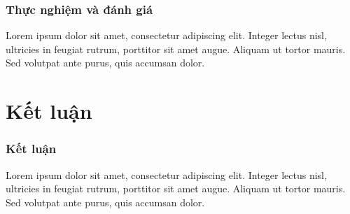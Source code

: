 \documentclass{beamer}
\begin{document}
	
	\begin{frame}
	\frametitle{Thực nghiệm và đánh giá}
		Lorem ipsum dolor sit amet, consectetur adipiscing elit. Integer lectus nisl, ultricies in feugiat rutrum, porttitor sit amet augue. Aliquam ut tortor mauris. Sed volutpat ante purus, quis accumsan dolor.
	\end{frame}

	
	\section{Kết luận}
	
	
	\begin{frame}
		\frametitle{Kết luận}
		Lorem ipsum dolor sit amet, consectetur adipiscing elit. Integer lectus nisl, ultricies in feugiat rutrum, porttitor sit amet augue. Aliquam ut tortor mauris. Sed volutpat ante purus, quis accumsan dolor.
	\end{frame}
	
\end{document}
